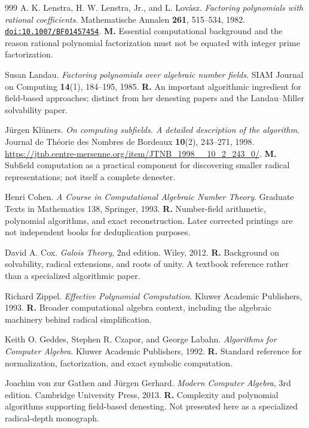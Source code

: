 \documentclass[11pt,a4paper]{article}
\newcommand{\doi}[1]{\href{https://doi.org/#1}{\nolinkurl{doi:#1}}}
\let\sourceurl\url
\theoremstyle{definition}
\theoremstyle{remark}
\numberwithin{equation}{section}
\begin{document}
\begin{thebibliography}{999}
A. K. Lenstra, H. W. Lenstra, Jr., and L. Lov\'asz.
\emph{Factoring polynomials with rational coefficients}.
Mathematische Annalen \textbf{261}, 515--534, 1982.
\doi{10.1007/BF01457454}.
\textbf{M.} Essential computational background and the reason rational polynomial factorization must not be equated with integer prime factorization.

Susan Landau.
\emph{Factoring polynomials over algebraic number fields}.
SIAM Journal on Computing \textbf{14}(1), 184--195, 1985.
\textbf{R.} An important algorithmic ingredient for field-based approaches; distinct from her denesting papers and the Landau--Miller solvability paper.

J\"urgen Kl\"uners.
\emph{On computing subfields. A detailed description of the algorithm}.
Journal de Th\'eorie des Nombres de Bordeaux \textbf{10}(2), 243--271, 1998.
\sourceurl{https://jtnb.centre-mersenne.org/item/JTNB_1998__10_2_243_0/}.
\textbf{M.} Subfield computation as a practical component for discovering smaller radical representations; not itself a complete denester.

Henri Cohen.
\emph{A Course in Computational Algebraic Number Theory}.
Graduate Texts in Mathematics 138, Springer, 1993.
\textbf{R.} Number-field arithmetic, polynomial algorithms, and exact reconstruction. Later corrected printings are not independent books for deduplication purposes.

David A. Cox.
\emph{Galois Theory}, 2nd edition.
Wiley, 2012.
\textbf{R.} Background on solvability, radical extensions, and roots of unity. A textbook reference rather than a specialized algorithmic paper.

Richard Zippel.
\emph{Effective Polynomial Computation}.
Kluwer Academic Publishers, 1993.
\textbf{R.} Broader computational algebra context, including the algebraic machinery behind radical simplification.

Keith O. Geddes, Stephen R. Czapor, and George Labahn.
\emph{Algorithms for Computer Algebra}.
Kluwer Academic Publishers, 1992.
\textbf{R.} Standard reference for normalization, factorization, and exact symbolic computation.

Joachim von zur Gathen and J\"urgen Gerhard.
\emph{Modern Computer Algebra}, 3rd edition.
Cambridge University Press, 2013.
\textbf{R.} Complexity and polynomial algorithms supporting field-based denesting. Not presented here as a specialized radical-depth monograph.


\end{thebibliography}
\end{document}

